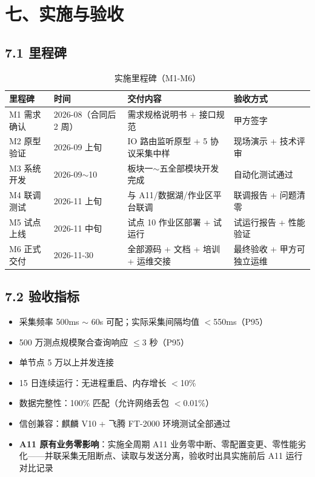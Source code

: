 \documentclass[11pt,a4paper]{ctexart}
\begin{document}
\section{七、实施与验收}

\subsection{7.1 里程碑}

\begin{table}[H]\centering
\caption{实施里程碑（M1-M6）}
\begin{tabular}{p{2.5cm} p{3cm} p{5cm} p{3.2cm}}
\toprule
\textbf{里程碑} & \textbf{时间} & \textbf{交付内容} & \textbf{验收方式} \\
\midrule
M1 需求确认 & 2026-08（合同后 2 周） & 需求规格说明书 + 接口规范 & 甲方签字 \\
M2 原型验证 & 2026-09 上旬 & IO 路由监听原型 + 5 协议采集中样 & 现场演示 + 技术评审 \\
M3 系统开发 & 2026-09$\sim$10 & 板块一$\sim$五全部模块开发完成 & 自动化测试通过 \\
M4 联调测试 & 2026-11 上旬 & 与 A11/数据湖/作业区平台联调 & 联调报告 + 问题清零 \\
M5 试点上线 & 2026-11 中旬 & 试点 10 作业区部署 + 试运行 & 试运行报告 + 性能验证 \\
M6 正式交付 & 2026-11-30 & 全部源码 + 文档 + 培训 + 运维交接 & 最终验收 + 甲方可独立运维 \\
\bottomrule
\end{tabular}
\end{table}

\subsection{7.2 验收指标}

\begin{itemize}[leftmargin=*]
  \item 采集频率 500ms $\sim$ 60s 可配；实际采集间隔均值 $<$550ms（P95）
  \item 500 万测点规模聚合查询响应 $\leq$3 秒（P95）
  \item 单节点 5 万以上并发连接
  \item 15 日连续运行：无进程重启、内存增长 $<$10\%
  \item 数据完整性：100\% 匹配（允许网络丢包 $<$0.01\%）
  \item 信创兼容：麒麟 V10 + 飞腾 FT-2000 环境测试全部通过
  \item \textbf{A11 原有业务零影响}：实施全周期 A11 业务零中断、零配置变更、零性能劣化——并联采集无阻断点、读取与发送分离，验收时出具实施前后 A11 运行对比记录
\end{itemize}
\end{document}
